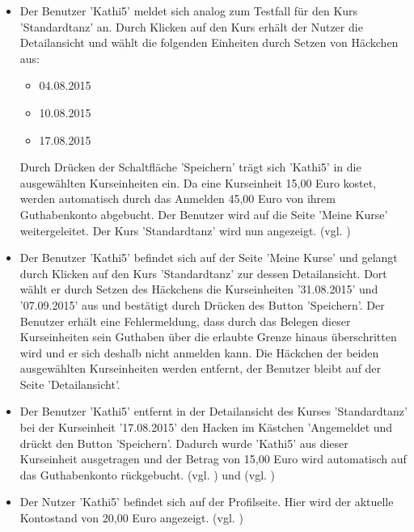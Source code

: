 \documentclass[a4paper]{scrreprt}
\begin{document}
\begin{itemize}
				\item {}
				Der Benutzer 'Kathi5' meldet sich analog zum Testfall  für den Kurs 'Standardtanz' an. Durch Klicken auf den Kurs erhält der Nutzer die Detailansicht und wählt die folgenden Einheiten durch Setzen von Häckchen aus:
					\begin{itemize}
						\item 04.08.2015 
						\item 10.08.2015 
						\item 17.08.2015 
					\end{itemize}	
				Durch Drücken der Schaltfläche 'Speichern' trägt sich 'Kathi5' in die ausgewählten Kurseinheiten ein. Da eine Kurseinheit 15,00 Euro kostet, werden automatisch durch das Anmelden 45,00 Euro von ihrem Guthabenkonto abgebucht. Der Benutzer wird auf die Seite 'Meine Kurse' weitergeleitet. Der Kurs 'Standardtanz' wird nun angezeigt. (vgl. )
		 
				\item {}
				Der Benutzer 'Kathi5' befindet sich auf der Seite 'Meine Kurse' und gelangt durch Klicken auf den Kurs 'Standardtanz' zur dessen Detailansicht. Dort wählt er durch Setzen des Häckchens die Kurseinheiten '31.08.2015' und '07.09.2015' aus und bestätigt durch Drücken des Button 'Speichern'. Der Benutzer erhält eine Fehlermeldung, dass durch das Belegen dieser Kurseinheiten sein Guthaben über die erlaubte Grenze hinaus überschritten wird und er sich deshalb nicht anmelden kann. Die Häckchen der beiden ausgewählten Kurseinheiten werden entfernt, der Benutzer bleibt auf der Seite 'Detailansicht'.
				
				\item {}
				Der Benutzer 'Kathi5' entfernt in der Detailansicht des Kurses 'Standardtanz' bei der Kurseinheit '17.08.2015' den Hacken im Kästchen 'Angemeldet und drückt den Button 'Speichern'. Dadurch wurde 'Kathi5' aus dieser Kurseinheit ausgetragen und der Betrag von 15,00 Euro wird automatisch auf das Guthabenkonto rückgebucht.  (vgl. ) und (vgl. )
				
				\item {}
				Der Nutzer 'Kathi5' befindet sich auf der Profilseite. Hier wird der aktuelle Kontostand von 20,00 Euro angezeigt. (vgl. )
				

\end{itemize}
\end{document}
